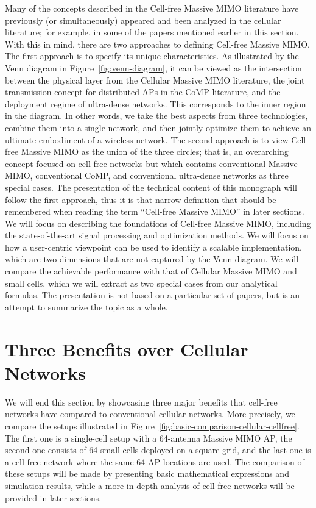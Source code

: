Many of the concepts described in the Cell-free Massive \gls{MIMO} literature have previously (or simultaneously) appeared and been analyzed in the cellular literature; for example, in some of the papers mentioned earlier in this section. 
With this in mind, there are two approaches to defining Cell-free Massive \gls{MIMO}. 
The first approach is to specify its unique characteristics. As illustrated by the Venn diagram in Figure~\ref{fig:venn-diagram}, it can be viewed as the intersection between the physical layer from the Cellular Massive MIMO literature, the joint transmission concept for distributed APs in the CoMP literature, and the deployment regime of ultra-dense networks. This corresponds to the inner region in the diagram. In other words, we take the best aspects from three technologies, combine them into a single network, and then jointly optimize them to achieve an ultimate embodiment of a wireless network. The second approach is to view Cell-free Massive \gls{MIMO} as the union of the three circles; that is, an overarching concept focused on cell-free networks but which contains conventional Massive MIMO, conventional CoMP, and conventional ultra-dense networks as three special cases. The presentation of the technical content of this monograph will follow the first approach, thus it is that narrow definition that should be remembered when reading the term ``Cell-free Massive MIMO'' in later sections.
We will focus on describing the foundations of Cell-free Massive \gls{MIMO}, including the state-of-the-art signal processing and optimization methods. We will focus on how a user-centric viewpoint can be used to identify a scalable implementation, which are two dimensions that are not captured by the Venn diagram. We will compare the achievable performance with that of Cellular Massive MIMO and small cells, which we will extract as two special cases from our analytical formulas. The presentation is not based on a particular set of papers, but is an attempt to summarize the topic as a whole.

\enlargethispage{2\baselineskip} 

\section{Three Benefits over Cellular Networks} \label{sec:benefits-cellular-networks}

We will end this section by showcasing three major benefits that cell-free networks have compared to conventional cellular networks. More precisely, we compare the setups illustrated in Figure~\ref{fig:basic-comparison-cellular-cellfree}. The first one is a single-cell setup with a 64-antenna Massive \gls{MIMO} \gls{AP}, the second one consists of 64 small cells deployed on a square grid, and the last one is a cell-free network where the same 64 \gls{AP} locations are used. The comparison of these setups will be made by presenting basic mathematical expressions and simulation results, while a more in-depth analysis of cell-free networks will be provided in later sections.


